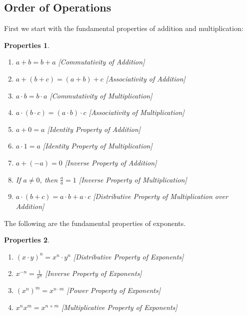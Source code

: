 \documentclass[oneside]{book}
\theoremstyle{mystyle}
\newtheorem{properties}{Properties}[section]
\begin{document}
\subsection{Order of Operations}
First we start with the fundamental properties of addition and multiplication:
\begin{properties}
\label{property:North_Shore_Arithmetic_Properties}
\
\begin{enumerate}[itemsep=0pt]
    \item \label{property:North_Shore_Arithmetic_Properties_Com_Add} $a+b = b+a$ \hfill [Commutativity of Addition]
    \item \label{property:north_shore_arithmetic_properties_assoc_add} $a+(b+c) = (a+b)+c$ \hfill [Associativity of Addition]
    \item \label{property:north_shore_arithmetic_properties_comm_mult} $a\cdot b = b \cdot a$ \hfill [Commutativity of Multiplication]
    \item \label{property:north_shore_arithmetic_properties_assoc_mult} $a\cdot (b\cdot c) = (a\cdot b)\cdot c$ \hfill [Associativity of Multiplication]
    \item \label{property:north_shore_arithmetic_properties_add_idenity} $a+0 = a$ \hfill [Identity Property of Addition]
    \item \label{property:north_shore_arithmetic_properties_mult_identity} $a\cdot 1 = a$ \hfill [Identity Property of Multiplication]
    \item \label{property:north_shore_arithmetic_properties_add_inverse} $a + (-a) = 0$ \hfill [Inverse Property of Addition]
    \item \label{property:north_shore_arithmetic_properties_mult_inverse} If $a\ne 0$, then $\frac{a}{a} = 1$ \hfill [Inverse Property of Multiplication]
    \item \label{property:north_shore_arithmetic_properties_distributive_property} $a\cdot (b+c) = a\cdot b + a\cdot c$ \hfill [Distributive Property of Multiplication over Addition]
\end{enumerate}
\end{properties}
The following are the fundamental properties of exponents.
\begin{properties}
\
\label{property:North_Shore_Exponent_Rules}
\begin{enumerate}[itemsep=0pt]
\item \label{property:north_shore_distributive_property_of_expo} $(x\cdot y)^n = x^n \cdot y^n$ \hfill [Distributive Property of Exponents]
\item \label{property:north_shore_inverse_proerty_of_expo} $x^{-n} = \frac{1}{x^n}$ \hfill [Inverse Property of Exponents]
\item \label{property:north_shore_power_property_of_expo} $(x^n)^m = x^{n\cdot m}$ \hfill [Power Property of Exponents]
\item \label{property:north_shore_product_property_of_expo} $x^{n} x^{m} = x^{n+m}$ \hfill [Multiplicative Property of Exponents]
\end{enumerate}
\end{properties}
\end{document}
